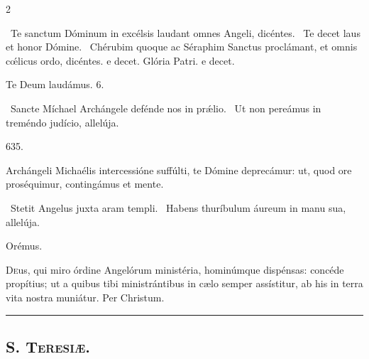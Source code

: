 \documentclass[9pt,twoside]{extarticle}
\begin{document}
\begin{multicols}{2}
\begin{tightlist}{}
\item {}~Te sanctum Dóminum in excélsis laudant omnes Angeli, dicéntes. \textred{*}~Te decet laus et honor Dómine. ~Chérubim quoque ac Séraphim Sanctus proclámant, et omnis cœ́licus ordo, dicéntes. e decet. Glória Patri. e decet.
\item Te Deum laudámus. 6.
\item {}~Sancte Míchael Archángele defénde nos in prǽlio. ~Ut non pereámus in treméndo judício, allelúja.
\item {} 635. 
\item {} Archángeli Michaélis intercessióne suffúlti, te Dómine deprecámur: ut, quod ore proséquimur, contingámus et mente.
\item {}~Stetit Angelus juxta aram templi. ~Habens thuríbulum áureum in manu sua, allelúja.
\item Orémus. \hfill {}
\end{tightlist}
\lettrine{D}eus, qui miro órdine Angelórum ministéria, hominúmque dispénsas: concéde propítius; ut a quibus tibi ministrántibus in cælo semper assístitur, ab his in terra vita nostra muniátur. Per Christum.

\begin{center}\textcolor{red}{\rule{\linewidth}{0.5pt}} \end{center}

\subsection*{\center \textsc{}}
\subsubsection*{\center {}}
\subsection*{\center \textsc{S. Teresiæ.}}
\subsubsection*{\center {}}


\end{multicols}
\end{document}
